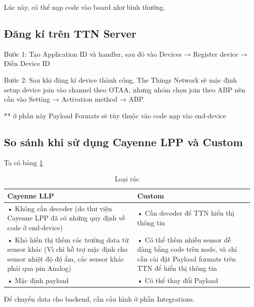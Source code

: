 Lúc này, có thể nạp code vào board như bình thường.

\subsection{Đăng kí trên TTN Server}
\begin{description}
    \item Bước 1: Tạo Application ID và handler, sau đó vào Devices → Register device → Điền Device ID  
    \item Bước 2: Sau khi đăng kí device thành công, The Things Network sẽ mặc định setup device join vào channel theo OTAA, nhưng nhóm chọn join theo ABP nên cần vào Setting → Activation method → ABP.
    
\end{description}



** ở phần này Payload Formats sẽ tùy thuộc vào code nạp vào end-device



\subsection{So sánh khi sử dụng Cayenne LPP và Custom}

Ta có bảng \ref{tab.comparison.Cayenne}

\begin{table}[H]
    \centering
    \caption{Loại rác} 
    \label{tab.comparison.Cayenne}
    \begin{tabular}{| m{6cm} | m{6cm} |}
        \hline
        Cayenne LLP & Custom \\

        \hline
        •	Không cần decoder (do thư viện Cayenne LPP đã có những quy định về code ở end-device) & •	Cần decoder để TTN hiển thị thông tin \\
        •	Khó hiển thị thêm các trường data từ sensor khác (Vì chỉ  hỗ trợ mặc định cho sensor nhiệt độ độ ẩm, các sensor khác phải qua pin Analog) & •	Có thể thêm nhiều sensor dễ dàng bằng code trên node, và chỉ cần cài đặt Payload formats trên TTN để hiển thị thông tin \\
        •	Mặc định payload & •	Có thể thay đổi Payload \\
        
        \hline
    \end{tabular}
\end{table}

Để chuyển data cho backend, cần cấu hình ở phần Integrations.



